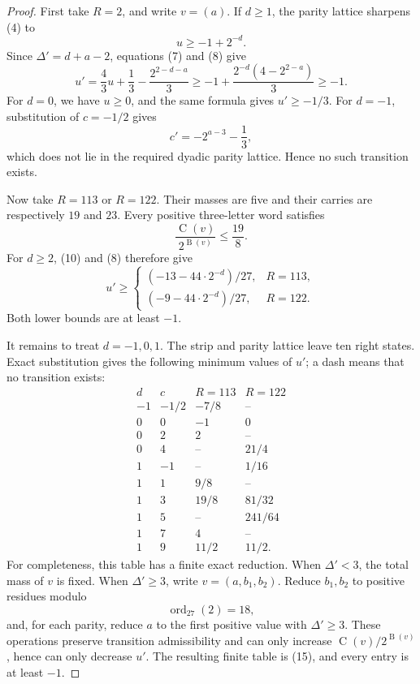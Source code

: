 \documentclass[11pt]{article}
\newcommand{\mass}{\operatorname{B}}
\newcommand{\car}{\operatorname{C}}
\begin{document}
\begin{proof}
First take \(R=2\), and write \(v=(a)\).  If \(d\geq1\), the parity
lattice sharpens (4) to
\[
 u\geq-1+2^{-d}.
 \tag{10}
\]
Since \(\Delta'=d+a-2\), equations (7) and (8) give
\[
 u'=\frac43u+\frac13-\frac{2^{2-d-a}}3
 \geq
 -1+\frac{2^{-d}(4-2^{2-a})}{3}
 \geq-1.
 \tag{11}
\]
For \(d=0\), we have \(u\geq0\), and the same formula gives
\(u'\geq-1/3\).  For \(d=-1\), substitution of \(c=-1/2\) gives
\[
 c'=-2^{a-3}-\frac13,
 \tag{12}
\]
which does not lie in the required dyadic parity lattice.  Hence no
such transition exists.

Now take \(R=113\) or \(R=122\).  Their masses are five and their
carries are respectively \(19\) and \(23\).  Every positive
three-letter word satisfies
\[
 \frac{\car(v)}{2^{\mass(v)}}\leq\frac{19}{8}.
 \tag{13}
\]
For \(d\geq2\), (10) and (8) therefore give
\[
 u'\geq
 \begin{cases}
 (-13-44\cdot2^{-d})/27,&R=113,\\
 (-9-44\cdot2^{-d})/27,&R=122.
 \end{cases}
 \tag{14}
\]
Both lower bounds are at least \(-1\).

It remains to treat \(d=-1,0,1\).  The strip and parity lattice leave
ten right states.  Exact substitution gives the following minimum
values of \(u'\); a dash means that no transition exists:
\[
\begin{array}{c|c|c|c}
d&c&R=113&R=122\\ \hline
-1&-1/2&-7/8&\text{--}\\
0&0&-1&0\\
0&2&2&\text{--}\\
0&4&\text{--}&21/4\\
1&-1&\text{--}&1/16\\
1&1&9/8&\text{--}\\
1&3&19/8&81/32\\
1&5&\text{--}&241/64\\
1&7&4&\text{--}\\
1&9&11/2&11/2.
\end{array}
\tag{15}
\]
For completeness, this table has a finite exact reduction.  When
\(\Delta'<3\), the total mass of \(v\) is fixed.  When
\(\Delta'\geq3\), write \(v=(a,b_1,b_2)\).  Reduce \(b_1,b_2\) to
positive residues modulo
\[
 \operatorname{ord}_{27}(2)=18,
 \tag{16}
\]
and, for each parity, reduce \(a\) to the first positive value with
\(\Delta'\geq3\).  These operations preserve transition
admissibility and can only increase
\(\car(v)/2^{\mass(v)}\), hence can only decrease \(u'\).
The resulting finite table is (15), and every entry is at least
\(-1\).
\end{proof}
\end{document}
